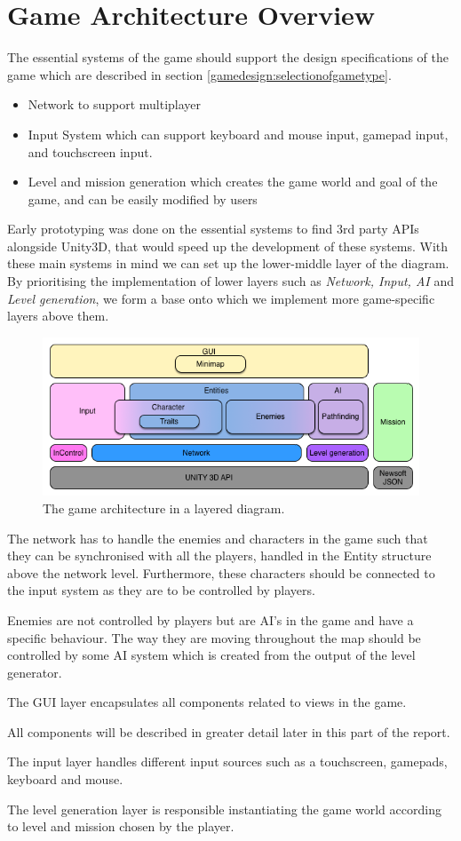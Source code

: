 \section{Game Architecture Overview}
The essential systems of the game should support the design specifications of the game which are described in section \ref{gamedesign:selectionofgametype}.
\begin{itemize}
    \item Network to support multiplayer
    \item Input System which can support keyboard and mouse input, gamepad input, and touchscreen input.
    \item Level and mission generation which creates the game world and goal of the game, and can be easily modified by users
\end{itemize}
Early prototyping was done on the essential systems to find 3rd party APIs alongside Unity3D, that would speed up the development of these systems.
With these main systems in mind we can set up the lower-middle layer of the diagram.
By prioritising the implementation of lower layers such as \textit{Network, Input, AI} and \textit{Level generation}, we form a base onto which we implement more game-specific layers above them.

\begin{figure}
	\includegraphics[width = \textwidth]{figures/architecture/game_architecture_overview.png}
	\caption{The game architecture in a layered diagram.}
	\label{fig:architecture:diagram}
\end{figure}

The network has to handle the enemies and characters in the game such that they can be synchronised with all the players, handled in the Entity structure above the network level.
Furthermore, these characters should be connected to the input system as they are to be controlled by players.

Enemies are not controlled by players but are AI's in the game and have a specific behaviour.
The way they are moving throughout the map should be controlled by some AI system which is created from the output of the level generator.

The GUI layer encapsulates all components related to views in the game.

All components will be described in greater detail later in this part of the report.

The input layer handles different input sources such as a touchscreen, gamepads, keyboard and mouse.

The level generation layer is responsible instantiating the game world according to level and mission chosen by the player.
